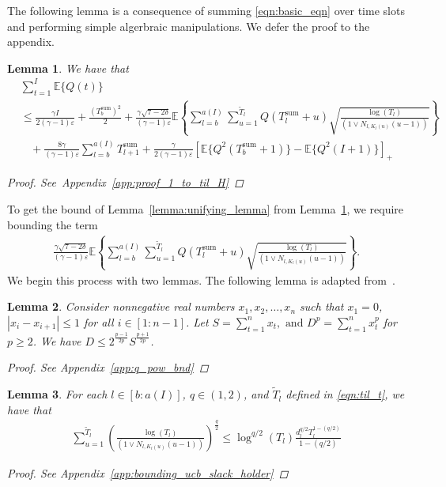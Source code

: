 \documentclass[12pt,draftcls, onecolumn]{IEEEtran}
\newtheorem{lemma}{Lemma}
\begin{document}
The following lemma is a consequence of summing \eqref{eqn:basic_eqn} over time slots and performing simple algerbraic manipulations. We defer the proof to the appendix.
\begin{lemma}\label{lemma:proof_1_to_til_H}
We have that
    \begin{align}
        &\sum_{t=1}^{I}\mathbb{E}\{Q(t)\} \nonumber\\&\leq \frac{\gamma I}{2(\gamma-1)\varepsilon}+ \frac{(T_b^{\text{sum}})^2}{2}  +\frac{\gamma\sqrt{7-2\delta}}{(\gamma-1)\varepsilon} \mathbb{E}\left\{\sum_{l=b}^{a( I)}\sum_{u=1}^{\tilde{T}_l} Q(T^{\text{sum}}_l+u)\sqrt{\frac{\log\left(T_l\right)}{(1 \vee N_{l,K_l(u)}(u-1))}}\right\} \nonumber\\&\ \ \ \  + \frac{8\gamma}{(\gamma-1)\varepsilon}\sum_{l=b}^{a( I)}T^{\text{sum}}_{l+1}  + \frac{\gamma}{2(\gamma-1)\varepsilon}\left[\mathbb{E}\{Q^2(T^{\text{sum}}_b+1)\}-\mathbb{E}\{Q^2( I+1)\}\right]_+ \nonumber
    \end{align}
\begin{proof}
See~Appendix~\ref{app:proof_1_to_til_H}
\end{proof}
\end{lemma}
To get the bound of Lemma~\ref{lemma:unifying_lemma} from Lemma~\ref{lemma:proof_1_to_til_H}, we require bounding the term
\begin{align}
    \frac{\gamma\sqrt{7-2\delta}}{(\gamma-1)\varepsilon} \mathbb{E}\left\{\sum_{l=b}^{a( I)}\sum_{u=1}^{\tilde{T}_l} Q(T^{\text{sum}}_l+u)\sqrt{\frac{\log\left(T_l\right)}{(1 \vee N_{l,K_l(u)}(u-1))}}\right\}.\nonumber
\end{align}
We begin this process with two lemmas. The following lemma is adapted from~\cite{Huang2024}.
 \begin{lemma}\label{lemma:q_pow_bnd}
Consider nonnegative real numbers $x_1,x_2,\dots,x_n$ such that $x_1 = 0$, $|x_i - x_{i+1}| \leq 1$ for all $i \in [1:n-1]$. Let $S = \sum_{t=1}^n x_t, \text{ and } D^p = \sum_{t=1}^n x_t^p$
for $p \geq 2$. We have $D \leq 2^{\frac{p-1}{2p}}S^{\frac{p+1}{2p}}$.
\begin{proof}
See Appendix~\ref{app:q_pow_bnd}
\end{proof}
\end{lemma}
\begin{lemma}\label{lemma:bounding_ucb_slack_holder}
For each $l \in [b:a( I)]$, $q \in (1,2)$, and $\tilde{T}_l$ defined in \eqref{eqn:til_t}, we have that
\begin{align}         
\sum_{u=1}^{\tilde{T}_l} \left(\frac{\log\left(T_l\right)}{(1 \vee N_{l,K_l(u)} (u-1))}\right)^{\frac{q}{2}} \leq  \log^{q/2}(T_l)\frac{d_l^{q/2}T_l^{1-(q/2)}}{1-(q/2)} \nonumber
\end{align}
\begin{proof}
See Appendix~\ref{app:bounding_ucb_slack_holder}
\end{proof}
\end{lemma}
\end{document}
